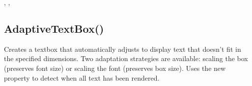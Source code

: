 \documentclass[letterpaper,10pt,english]{sphinxmanual}
\begin{document}
\sphinxAtStartPar
{}

\sphinxAtStartPar
{}, , 

\ignorespaces 

\subsection{AdaptiveTextBox()}
\label{\detokenize{reference/ui:adaptivetextbox}}\label{\detokenize{reference/ui:index-34}}
\sphinxAtStartPar
{}

\sphinxAtStartPar
{}

\sphinxAtStartPar
Creates a textbox that automatically adjusts to display text that doesn’t fit in the specified dimensions. Two adaptation strategies are available: scaling the box (preserves font size) or scaling the font (preserves box size). Uses the new  property to detect when all text has been rendered.

\sphinxAtStartPar
{}

\begin{sphinxVerbatim}[commandchars=\\\{\}]
\end{sphinxVerbatim}
\end{document}

